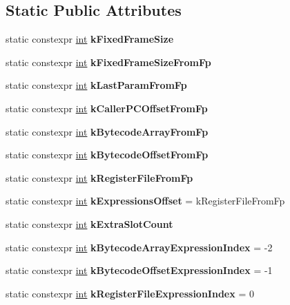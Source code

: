 \subsection*{Static Public Attributes}
\begin{DoxyCompactItemize}
\item 
static constexpr \mbox{\hyperlink{classint}{int}} {\bfseries k\+Fixed\+Frame\+Size}
\item 
static constexpr \mbox{\hyperlink{classint}{int}} {\bfseries k\+Fixed\+Frame\+Size\+From\+Fp}
\item 
static constexpr \mbox{\hyperlink{classint}{int}} {\bfseries k\+Last\+Param\+From\+Fp}
\item 
static constexpr \mbox{\hyperlink{classint}{int}} {\bfseries k\+Caller\+P\+C\+Offset\+From\+Fp}
\item 
static constexpr \mbox{\hyperlink{classint}{int}} {\bfseries k\+Bytecode\+Array\+From\+Fp}
\item 
static constexpr \mbox{\hyperlink{classint}{int}} {\bfseries k\+Bytecode\+Offset\+From\+Fp}
\item 
static constexpr \mbox{\hyperlink{classint}{int}} {\bfseries k\+Register\+File\+From\+Fp}
\item 
\mbox{\label{classv8_1_1internal_1_1InterpreterFrameConstants_a51cda60e77e5dba88587ee2d50626e24}} 
static constexpr \mbox{\hyperlink{classint}{int}} {\bfseries k\+Expressions\+Offset} = k\+Register\+File\+From\+Fp
\item 
static constexpr \mbox{\hyperlink{classint}{int}} {\bfseries k\+Extra\+Slot\+Count}
\item 
\mbox{\label{classv8_1_1internal_1_1InterpreterFrameConstants_a1d88fffd34319a8f4195615e97074dde}} 
static constexpr \mbox{\hyperlink{classint}{int}} {\bfseries k\+Bytecode\+Array\+Expression\+Index} = -\/2
\item 
\mbox{\label{classv8_1_1internal_1_1InterpreterFrameConstants_afca2adf4a004a9c3fe69d1ffbfadde35}} 
static constexpr \mbox{\hyperlink{classint}{int}} {\bfseries k\+Bytecode\+Offset\+Expression\+Index} = -\/1
\item 
\mbox{\label{classv8_1_1internal_1_1InterpreterFrameConstants_acab9e4667fba3aa4caac682d86b85855}} 
static constexpr \mbox{\hyperlink{classint}{int}} {\bfseries k\+Register\+File\+Expression\+Index} = 0
\end{DoxyCompactItemize}


